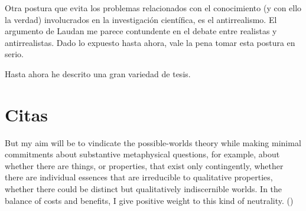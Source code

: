 


Otra postura que evita los problemas relacionados con el conocimiento (y con ello la verdad) involucrados en la investigación científica, es el antirrealismo. El argumento de Laudan me parece contundente en el debate entre realistas y antirrealistas. Dado lo expuesto hasta ahora, vale la pena tomar esta postura en serio.

Hasta ahora he descrito una gran variedad de tesis. 


\section{Citas}

But my aim will be to vindicate the possible-worlds theory while making minimal commitments about substantive metaphysical questions, for example, about whether there are things, or properties, that exist only contingently, whether there are individual essences that are irreducible to qualitative properties, whether there could be distinct but qualitatively indiscernible worlds. In the balance of costs and benefits, I give positive weight to this kind of neutrality. (\cite{stalnaker2012})
